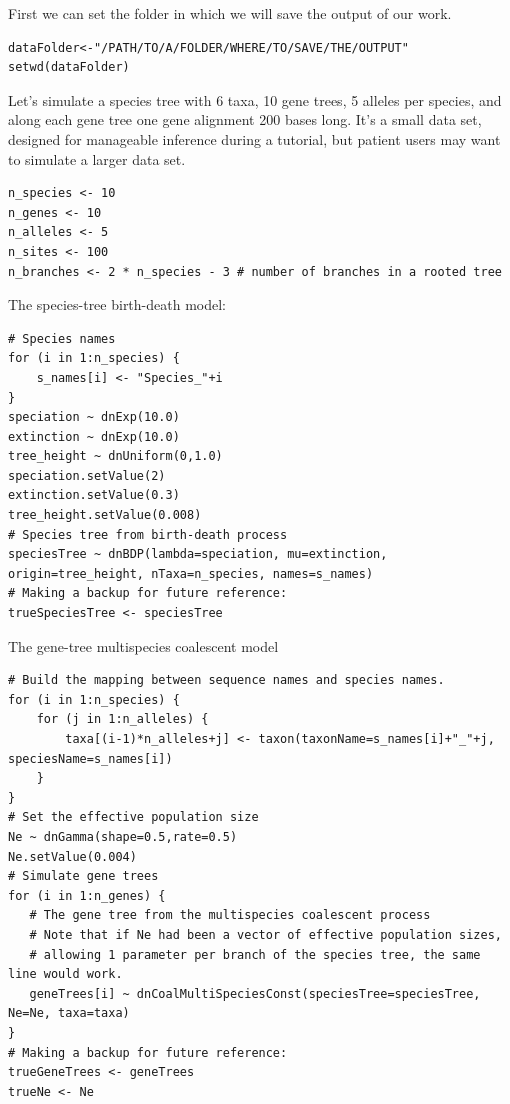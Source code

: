 \documentclass[11pt]{article}
\begin{document}
{\begin{framed}
First we can set the folder in which we will save the output of our work.
 {\tt \begin{snugshade*}
\begin{lstlisting}
dataFolder<-"/PATH/TO/A/FOLDER/WHERE/TO/SAVE/THE/OUTPUT"
setwd(dataFolder)
\end{lstlisting}
\end{snugshade*}}

Let's simulate a species tree with 6 taxa, 10 gene trees, 5 alleles per species, and along each gene tree one gene alignment 200 bases long.
It's a small data set, designed for manageable inference during a tutorial, but patient users may want to simulate a larger data set.

 {\tt \begin{snugshade*}
\begin{lstlisting}
n_species <- 10
n_genes <- 10
n_alleles <- 5
n_sites <- 100
n_branches <- 2 * n_species - 3 # number of branches in a rooted tree
\end{lstlisting}
\end{snugshade*}}

The species-tree birth-death model:

 {\tt \begin{snugshade*}
\begin{lstlisting}
# Species names
for (i in 1:n_species) {
	s_names[i] <- "Species_"+i
}
speciation ~ dnExp(10.0)
extinction ~ dnExp(10.0)
tree_height ~ dnUniform(0,1.0)
speciation.setValue(2)
extinction.setValue(0.3)
tree_height.setValue(0.008)
# Species tree from birth-death process
speciesTree ~ dnBDP(lambda=speciation, mu=extinction, origin=tree_height, nTaxa=n_species, names=s_names)
# Making a backup for future reference:
trueSpeciesTree <- speciesTree
\end{lstlisting}
\end{snugshade*}}

The gene-tree multispecies coalescent model
 {\tt \begin{snugshade*}
\begin{lstlisting}
# Build the mapping between sequence names and species names.
for (i in 1:n_species) {
	for (j in 1:n_alleles) {
		taxa[(i-1)*n_alleles+j] <- taxon(taxonName=s_names[i]+"_"+j, speciesName=s_names[i])
	}
}
# Set the effective population size
Ne ~ dnGamma(shape=0.5,rate=0.5)
Ne.setValue(0.004)
# Simulate gene trees
for (i in 1:n_genes) {
   # The gene tree from the multispecies coalescent process
   # Note that if Ne had been a vector of effective population sizes, 
   # allowing 1 parameter per branch of the species tree, the same line would work.
   geneTrees[i] ~ dnCoalMultiSpeciesConst(speciesTree=speciesTree, Ne=Ne, taxa=taxa)
}
# Making a backup for future reference:
trueGeneTrees <- geneTrees
trueNe <- Ne
\end{lstlisting}
\end{snugshade*}}


\end{framed}}
\end{document}
